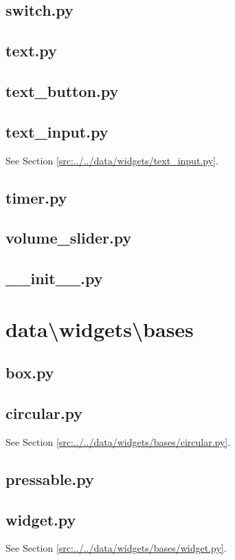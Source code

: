 \documentclass[../main/main.tex]{subfiles}
\begin{document}
\subsection{switch.py}

\label{src:data/widgets/switch.py}

\subsection{text.py}

\label{src:data/widgets/text.py}

\subsection{text\_button.py}

\label{src:data/widgets/text_button.py}

\subsection{text\_input.py}
See Section \ref{src:../../data/widgets/text_input.py}.

\subsection{timer.py}

\label{src:data/widgets/timer.py}

\subsection{volume\_slider.py}

\label{src:data/widgets/volume_slider.py}

\subsection{\_\_init\_\_.py}

\label{src:data/widgets/__init__.py}

\section{data\textbackslash widgets\textbackslash bases}
\subsection{box.py}

\label{src:data/widgets/bases/box.py}

\subsection{circular.py}
See Section \ref{src:../../data/widgets/bases/circular.py}.

\subsection{pressable.py}

\label{src:data/widgets/bases/pressable.py}

\subsection{widget.py}
See Section \ref{src:../../data/widgets/bases/widget.py}.
\end{document}
